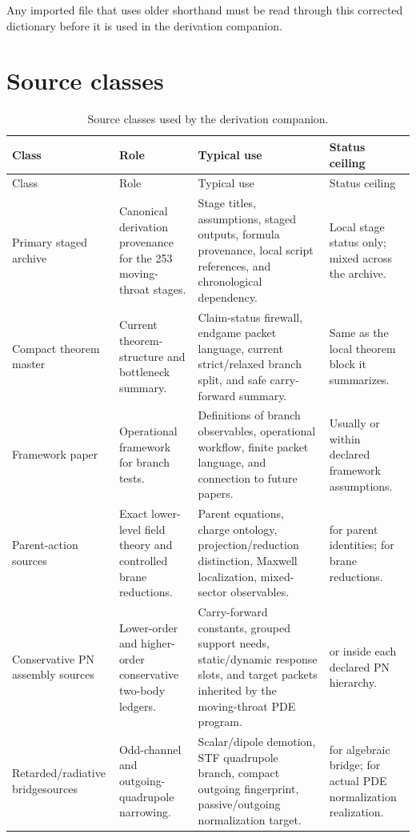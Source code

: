Any imported file that uses older shorthand must be read through this corrected dictionary before it is used in the derivation companion.

\section{Source classes}
\label{sec:source-classes}

\begin{longtable}{@{}L{0.14\textwidth}L{0.22\textwidth}L{0.39\textwidth}L{0.18\textwidth}@{}}
\caption{Source classes used by the derivation companion.}\label{tab:source-classes}\\
\toprule
Class & Role & Typical use & Status ceiling \\
\midrule
\endfirsthead
\toprule
Class & Role & Typical use & Status ceiling \\
\midrule
\endhead
Primary staged archive & Canonical derivation provenance for the 253 moving-throat stages. & Stage titles, assumptions, staged outputs, formula provenance, local script references, and chronological dependency. & Local stage status only; mixed across the archive. \\
\addlinespace
Compact theorem master & Current theorem-structure and bottleneck summary. & Claim-status firewall, endgame packet language, current strict/relaxed branch split, and safe carry-forward summary. & Same as the local theorem block it summarizes. \\
\addlinespace
Framework paper & Operational framework for branch tests. & Definitions of branch observables, operational workflow, finite packet language, and connection to future papers. & Usually \StatusReduced{} or \StatusExactClosure{} within declared framework assumptions. \\
\addlinespace
Parent-action sources & Exact lower-level field theory and controlled brane reductions. & Parent equations, charge ontology, projection/reduction distinction, Maxwell localization, mixed-sector observables. & \StatusExact{} for parent identities; \StatusReduced{} for brane reductions. \\
\addlinespace
Conservative PN assembly sources & Lower-order and higher-order conservative two-body ledgers. & Carry-forward constants, grouped support needs, static/dynamic response slots, and target packets inherited by the moving-throat PDE program. & \StatusExactClosure{} or \StatusReduced{} inside each declared PN hierarchy. \\
\addlinespace
Retarded/\newline radiative bridge\newline sources & Odd-channel and outgoing-quadrupole narrowing. & Scalar/dipole demotion, STF quadrupole branch, compact outgoing fingerprint, passive/outgoing normalization target. & \StatusExactClosure{} for algebraic bridge; \StatusOpen{} for actual PDE normalization realization. \\

\end{longtable}
